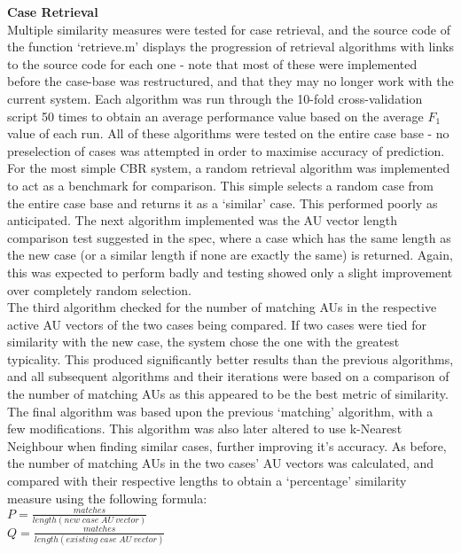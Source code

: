 \documentclass[a4paper]{article}
\begin{document}
{\bf Case Retrieval}\\
Multiple similarity measures were tested for case retrieval, and the source code of the function `retrieve.m' displays the progression of retrieval
algorithms with links to the source code for each one - note that most of these were implemented before the case-base was restructured, and that
they may no longer work with the current system. Each algorithm was run through the 10-fold cross-validation script 50 times to obtain an average
performance value based on the average $F_1$ value of each run. All of these algorithms were tested on the entire case base - no preselection
of cases was attempted in order to maximise accuracy of prediction.\\
For the most simple CBR system, a random retrieval algorithm was implemented to act as a benchmark
for comparison. This simple selects a random case from the entire case base and returns it as a `similar' case. This performed poorly as anticipated.
The next algorithm implemented was the AU vector length comparison test suggested in the spec, where a case which has the same length as the new case
(or a similar length if none are exactly the same) is returned. Again, this was expected to perform badly and testing showed only a slight improvement
over completely random selection.\\
The third algorithm checked for the number of matching AUs in the respective active AU vectors of the two cases being compared. If two cases were
tied for similarity with the new case, the system chose the one with the greatest typicality. This produced significantly better results than the 
previous algorithms, and all subsequent algorithms and their iterations were based on a comparison of the number of matching AUs as this appeared
to be the best metric of similarity.\\
The final algorithm was based upon the previous `matching' algorithm, with a few modifications. This algorithm was also later altered to use k-Nearest
Neighbour when finding similar cases, further improving it's accuracy.
As before, the number of matching AUs in the two cases' AU vectors
was calculated, and compared with their respective lengths to obtain a `percentage' similarity measure using the following formula:\\


$P = \frac{matches}{length(new\;case\;AU\:vector)}$\\

$Q = \frac{matches}{length(existing\;case\;AU\:vector)}$\\
\end{document}
